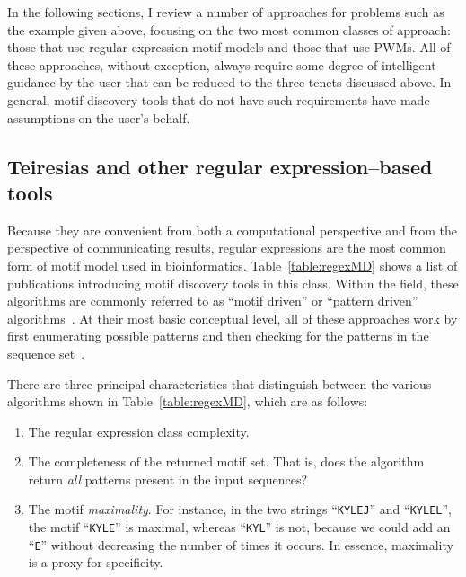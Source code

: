     In the following sections, I review a number of approaches for
    problems such as the example given above,
    focusing on the two most common classes of
    approach: those that use regular expression motif models and
    those that use PWMs.  All of these approaches, without
    exception, always require some degree of intelligent guidance by
    the user that can be reduced to the three tenets discussed
    above.  In general, motif discovery tools that do not have such
    requirements have made assumptions on the user's behalf.



\subsection*{Teiresias and other regular expression--based
tools}\label{section:teiresias}

    Because they are convenient from both a computational
    perspective and from the perspective of communicating results,
    regular expressions are the most common form of motif model used
    in bioinformatics.  Table~\vref{table:regexMD} shows a list of
    publications introducing motif discovery tools in this class.
    Within the field, these algorithms are commonly referred to as ``motif driven''
    or ``pattern driven''
            algorithms~\cite{brazma1998pattern}.
            At their most basic conceptual level, all of these
            approaches work by first enumerating possible patterns
            and then checking for the patterns in the sequence
            set~\cite{brazma1998pattern}.

            There are three principal characteristics that distinguish between the various
            algorithms shown in Table~\ref{table:regexMD}, which are as
            follows:
            \begin{enumerate}
                \item   The regular expression class complexity.
                \item   The completeness of the returned motif set.  That is, does the algorithm return \emph{all}
                        patterns present in the input sequences?
                \item   The motif \emph{maximality}.  For instance, in the two strings ``\texttt{KYLEJ}'' and ``\texttt{KYLEL}'',
                        the motif ``\texttt{KYLE}'' is maximal, whereas ``\texttt{KYL}'' is not, because we could
                        add an ``\texttt{E}'' without decreasing the number of times it
                        occurs.  In essence, maximality is a proxy
                        for specificity.
            \end{enumerate}

